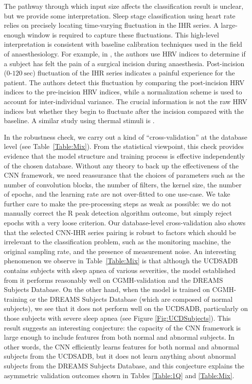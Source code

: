 \documentclass[10pt,a4paper,english]{amsart}
\begin{document}
The pathway through which input size affects the classification result is unclear, but we provide some interpretation. Sleep stage classification using heart rate relies on precisely locating time-varying fluctuation in the IHR series. A large-enough window is required to capture these fluctuations. 
This high-level interpretation is consistent with baseline calibration techniques used in the field of anaesthesiology. For example, in \cite{Seitsonen2005}, the authors use HRV indices to determine if a subject has felt the pain of a surgical incision during anaesthesia. Post-incision ($0\texttt{-}120 \ \mathrm{sec}$) fluctuation of the IHR series indicates a painful experience for the patient. The authors detect this fluctuation by comparing the post-incision HRV indices to the pre-incision HRV indices, while a normalization scheme is used to account for inter-individual variance. The crucial information is not the raw HRV indices but whether they begin to fluctuate after the incision compared with the baseline.  A similar study using thermal stimuli is \cite{Hamunen2012}. 

In the robustness check, we carry out a kind of ``cross-validation'' at the database level (see Table~\ref{Table:Mix}). From the statistical viewpoint, this check provides evidence that the model structure and training process is effective independently of the chosen database.  Without any theory to back up the effectiveness of the CNN framework, we need reassurance that the choices of parameters such as the number of convolution blocks, the number of filters, the kernel size, the number of epochs, and the learning rate are not over-fitted to one use-case.  We take further care to make the pre-processing steps as weak as possible: we do not manually correct the R peak detection algorithm outcome, but simply reject epochs with a very loose criterion. 
%
Our database-level cross-validation also shows that the selected CNN-IHR series pairing is robust to factors which should be irrelevant to the classification problem, such as the monitoring machine, the original sampling rate, and the presence of measurement noise. 
%
An interesting phenomenon we observe in Table~\ref{Table:Mix} is that although the UCDSADB contains subjects with sleep apnea of various severities, the model established from it performs reasonably well on CGMH-validation and the DREAMS Subjects Database.
On the other hand, when the model is trained on CGMH-training or the DREAMS Subjects Database (which are composed of normal subjects), we see that it does not perform well on the UCDSADB, particularly on those subjects with severe sleep apnea (see Figure \ref{Fig:UCDSubjects}). This result suggests an interesting conjecture: the capacity of the CNN framework is large enough to include features from both normal and abnormal subjects. In other words, the CNN efficiently learns features for both normal and abnormal subjects from the UCDSADB, but it does not learn anything about abnormal subjects from the DREAMS Subjects Database, and this conjecture explains the asymmetric validation outcomes shown in Tables \ref{Table:1Q} and \ref{Table:Mix}.
\end{document}
